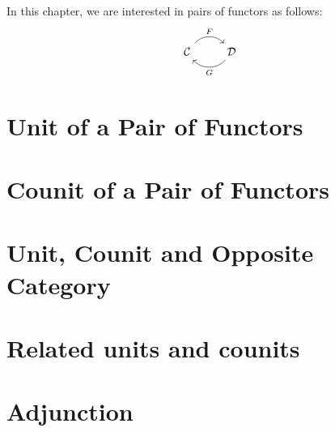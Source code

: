In this chapter, we are interested in pairs of functors as follows:
    \[
        \begin{tikzcd}
              \Cat \arrow[r, "F", bend left  = 50, ""{name=U, below}]
            & \Dat \arrow[l, "G", bend left = 50, ""{name=D, above}]
        \end{tikzcd}
    \]
\section{Unit of a Pair of Functors}
    
\section{Counit of a Pair of Functors}
    
\section{Unit, Counit and Opposite Category}
    
\section{Related units and counits}
    
\section{Adjunction}
    
